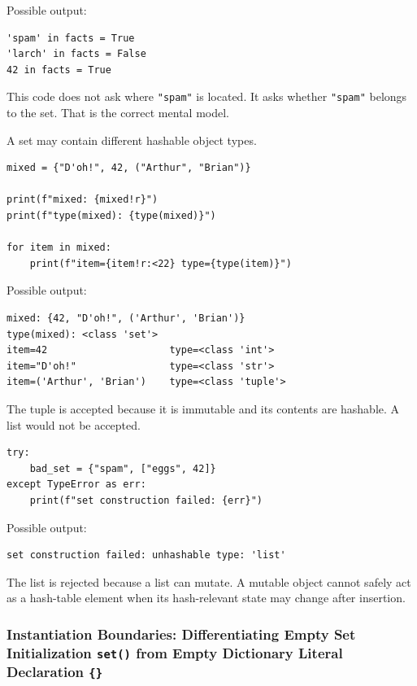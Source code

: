 Possible output:

\begin{verbatim}
'spam' in facts = True
'larch' in facts = False
42 in facts = True
\end{verbatim}

This code does not ask where \texttt{"spam"} is located. It asks whether \texttt{"spam"} belongs to the set. That is the correct mental model.

A set may contain different hashable object types.

\begin{verbatim}
mixed = {"D'oh!", 42, ("Arthur", "Brian")}

print(f"mixed: {mixed!r}")
print(f"type(mixed): {type(mixed)}")

for item in mixed:
    print(f"item={item!r:<22} type={type(item)}")
\end{verbatim}

Possible output:

\begin{verbatim}
mixed: {42, "D'oh!", ('Arthur', 'Brian')}
type(mixed): <class 'set'>
item=42                     type=<class 'int'>
item="D'oh!"                type=<class 'str'>
item=('Arthur', 'Brian')    type=<class 'tuple'>
\end{verbatim}

The tuple is accepted because it is immutable and its contents are hashable. A list would not be accepted.

\begin{verbatim}
try:
    bad_set = {"spam", ["eggs", 42]}
except TypeError as err:
    print(f"set construction failed: {err}")
\end{verbatim}

Possible output:

\begin{verbatim}
set construction failed: unhashable type: 'list'
\end{verbatim}

The list is rejected because a list can mutate. A mutable object cannot safely act as a hash-table element when its hash-relevant state may change after insertion.

\subsubsection{Instantiation Boundaries: Differentiating Empty Set Initialization \texttt{set()} from Empty Dictionary Literal Declaration \texttt{\{\}}}

